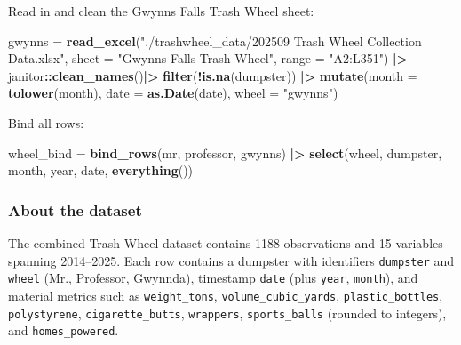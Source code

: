 \documentclass[
]{article}
\newenvironment{Shaded}{\begin{snugshade}}{\end{snugshade}}
\newcommand{\AttributeTok}[1]{\textcolor[rgb]{0.13,0.29,0.53}{#1}}
\newcommand{\FunctionTok}[1]{\textcolor[rgb]{0.13,0.29,0.53}{\textbf{#1}}}
\newcommand{\NormalTok}[1]{#1}
\newcommand{\OtherTok}[1]{\textcolor[rgb]{0.56,0.35,0.01}{#1}}
\newcommand{\SpecialCharTok}[1]{\textcolor[rgb]{0.81,0.36,0.00}{\textbf{#1}}}
\newcommand{\StringTok}[1]{\textcolor[rgb]{0.31,0.60,0.02}{#1}}
\begin{document}
Read in and clean the Gwynns Falls Trash Wheel sheet:

\begin{Shaded}
\begin{Highlighting}[]
\NormalTok{gwynns }\OtherTok{=} 
  \FunctionTok{read\_excel}\NormalTok{(}\StringTok{"./trashwheel\_data/202509 Trash Wheel Collection Data.xlsx"}\NormalTok{,}
                           \AttributeTok{sheet =} \StringTok{"Gwynns Falls Trash Wheel"}\NormalTok{,}
                           \AttributeTok{range =} \StringTok{"A2:L351"}\NormalTok{) }\SpecialCharTok{|\textgreater{}}
\NormalTok{  janitor}\SpecialCharTok{::}\FunctionTok{clean\_names}\NormalTok{()}\SpecialCharTok{|\textgreater{}}
  \FunctionTok{filter}\NormalTok{(}\SpecialCharTok{!}\FunctionTok{is.na}\NormalTok{(dumpster)) }\SpecialCharTok{|\textgreater{}}
  \FunctionTok{mutate}\NormalTok{(}\AttributeTok{month =} \FunctionTok{tolower}\NormalTok{(month),}
         \AttributeTok{date  =} \FunctionTok{as.Date}\NormalTok{(date),}
         \AttributeTok{wheel =} \StringTok{"gwynns"}\NormalTok{)}
\end{Highlighting}
\end{Shaded}

Bind all rows:

\begin{Shaded}
\begin{Highlighting}[]
\NormalTok{wheel\_bind }\OtherTok{=} 
  \FunctionTok{bind\_rows}\NormalTok{(mr, professor, gwynns) }\SpecialCharTok{|\textgreater{}}
  \FunctionTok{select}\NormalTok{(wheel, dumpster, month, year, date, }\FunctionTok{everything}\NormalTok{())}
\end{Highlighting}
\end{Shaded}

\subsubsection{About the dataset}\label{about-the-dataset}

The combined Trash Wheel dataset contains 1188 observations and 15
variables spanning 2014--2025. Each row contains a dumpster with
identifiers \texttt{dumpster} and \texttt{wheel} (Mr., Professor,
Gwynnda), timestamp \texttt{date} (plus \texttt{year}, \texttt{month}),
and material metrics such as \texttt{weight\_tons},
\texttt{volume\_cubic\_yards}, \texttt{plastic\_bottles},
\texttt{polystyrene}, \texttt{cigarette\_butts}, \texttt{wrappers},
\texttt{sports\_balls} (rounded to integers), and
\texttt{homes\_powered}.
\end{document}
